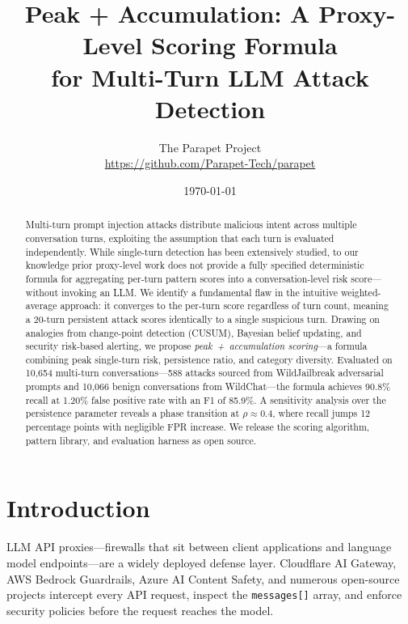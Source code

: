 \documentclass[11pt,a4paper]{article}
\title{Peak + Accumulation: A Proxy-Level Scoring Formula\\for Multi-Turn LLM Attack Detection}
\author{
    The Parapet Project \\
    \url{https://github.com/Parapet-Tech/parapet}
  }
\date{\today}
\begin{document}
\maketitle

\begin{abstract}

Multi-turn prompt injection attacks distribute malicious intent across
multiple conversation turns, exploiting the assumption that each turn is
evaluated independently. While single-turn detection has been extensively
studied, to our knowledge prior proxy-level work does not provide a
fully specified deterministic formula for aggregating per-turn pattern
scores into a conversation-level risk score---without invoking an LLM.
We identify a fundamental flaw in the intuitive
weighted-average approach: it converges to the per-turn score regardless
of turn count, meaning a 20-turn persistent attack scores identically to
a single suspicious turn. Drawing on analogies from change-point
detection (CUSUM), Bayesian belief updating, and security risk-based
alerting, we propose \emph{peak~+~accumulation scoring}---a formula
combining peak single-turn risk, persistence ratio, and category
diversity. Evaluated on 10,654 multi-turn conversations---588 attacks
sourced from WildJailbreak adversarial prompts and 10,066 benign
conversations from WildChat---the formula achieves 90.8\% recall at
1.20\% false positive rate with an F1 of 85.9\%. A sensitivity analysis
over the persistence parameter reveals a phase transition at $\rho
\approx 0.4$, where recall jumps 12 percentage points with negligible
FPR increase. We release the scoring algorithm, pattern library, and
evaluation harness as open source.

\end{abstract}

\section{Introduction}
\label{sec:intro}

LLM API proxies---firewalls that sit between client applications and
language model endpoints---are a widely deployed defense layer.
Cloudflare AI Gateway, AWS Bedrock Guardrails, Azure AI Content Safety,
and numerous open-source projects intercept every API request, inspect
the \texttt{messages[]} array, and enforce security policies before the
request reaches the model.
\end{document}
